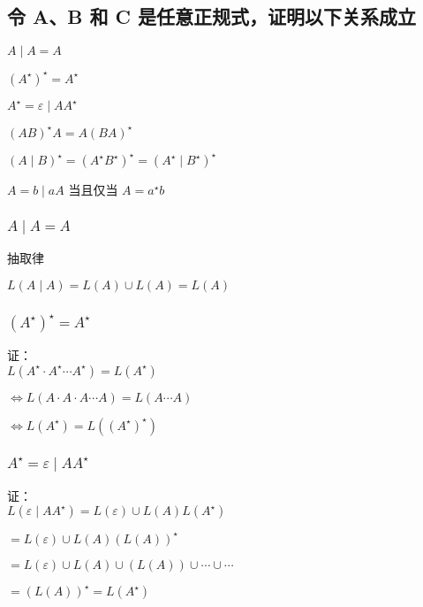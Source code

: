 \documentclass[12pt, a4paper]{article}
\begin{document}
    \subsection{令 A、B 和 C 是任意正规式，证明以下关系成立}

    {$A \mid A = A$}

    {$(A^{\star})^{\star} = A^{\star}$}

    {$A^{\star} = \varepsilon \mid AA^{\star}$}

    {$(AB)^{\star}A = A(BA)^{\star}$}

    {$(A \mid B)^{\star} = (A^{\star}B^{\star})^{\star} = (A^{\star} \mid B^{\star})^{\star}$}

    {$A = b \mid aA$ 当且仅当 $A = a^{\star}b$}

    \subsubsection{$A \mid A = A$}

    {抽取律}
    
    {$L(A \mid A) = L(A) \cup L(A) = L(A)$}
    \subsubsection{$(A^{\star})^{\star} = A^{\star}$}

    {证：}\\

    {$L(A^{\star}\cdot A^{\star}\cdots A^{\star}) = L(A^{\star})$}

    {$\Longleftrightarrow L(A \cdot A \cdot A \cdots A) = L(A \cdots A)$}

    {$\Longleftrightarrow L(A^{\star}) = L((A^{\star})^{\star})$}

    \subsubsection{$A^{\star} = \varepsilon \mid AA^{\star}$}

    {证：}\\

    {$L(\varepsilon \mid AA^{\star}) = L(\varepsilon) \cup L(A)L(A^{\star})$}

    {$= L(\varepsilon) \cup L(A)(L(A))^{\star}$}

    {$= L(\varepsilon) \cup L(A) \cup (L(A))\cup\cdots\cup\cdots$}

    {$= (L(A))^{\star} = L(A^{\star})$}\\
\end{document}
